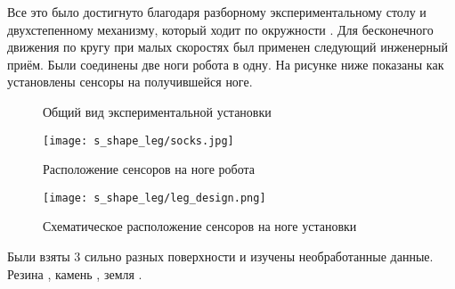 Все это было достигнуто благодаря разборному экспериментальному столу и двухстепенному механизму, который ходит по окружности . Для бесконечного движения по кругу при малых скоростях был применен следующий инженерный приём. Были соединены две ноги робота в одну. На рисунке ниже  показаны как установлены сенсоры на получившейся ноге.

\begin{figure}[H]
    \centering
    \caption{Общий вид экспериментальной установки}
    \label{fig:s_shape_leg/s_leg_setup.JPG}
\end{figure}

\begin{figure}[H]
        \centering\texttt{[image: s\_shape\_leg/socks.jpg]}
        \caption{Расположение сенсоров на ноге робота}
        \label{fig:s_shape_leg/socks.jpg}
\end{figure}

\begin{figure}
        \centering\texttt{[image: s\_shape\_leg/leg\_design.png]}
        \caption{Схематическое расположение сенсоров на ноге установки}
        \label{fig:s_shape_leg/leg_design.png}
\end{figure}

Были взяты 3 сильно разных поверхности и изучены необработанные данные. Резина   \quad {} \quad, камень  \quad {}, земля .

